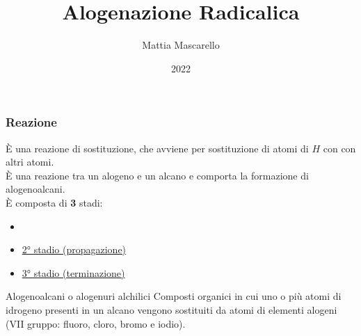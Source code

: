 \documentclass{beamer}
\title{Alogenazione Radicalica}
\author{Mattia Mascarello}
\institute[Liceo Cocito] %
{
	
	Chimica Organica\\
	Liceo Scientifico Statale ``Leonardo Cocito''\\
	prof. Marina Orazietti

}
\date{2022}
\begin{document}
	
	\frame{\titlepage}
	
	\begin{frame}
		\frametitle{Reazione}
		È una \alert{reazione di sostituzione}, che avviene per sostituzione di atomi di $H$ con con altri atomi.\\
		È una reazione tra un alogeno e un alcano e comporta la formazione di \alert{alogenoalcani}.\\
		È composta di \textbf{3} stadi:
		\begin{itemize}
			\item {}\\
			\item\hyperlink{propagazione}{2° stadio (propagazione)}\\
			\item\hyperlink{terminazione}{3° stadio (terminazione)}
		\end{itemize}
		\begin{block}{Alogenoalcani o alogenuri alchilici}
	Composti organici in cui uno o più atomi di idrogeno presenti in un alcano vengono sostituiti da atomi di elementi alogeni (VII gruppo: fluoro, cloro, bromo e iodio).
	\end{block}
	\end{frame}
\end{document}

